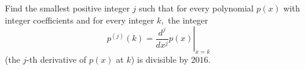 Find the smallest positive integer $j$ such that for every polynomial $p(x)$ with integer coefficients and for every integer $k,$ the integer
\[p^{(j)}(k)=\left. \frac{d^j}{dx^j}p(x) \right|_{x=k}\](the $j$-th derivative of $p(x)$ at $k$) is divisible by $2016.$